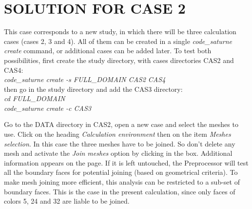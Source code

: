
%
%
%
%


\section{SOLUTION FOR CASE 2}
This case corresponds to a new study, in which there will be three calculation
cases (cases 2, 3 and 4). All of them can be created in a single {\itshape
code\_saturne create} command, or additional cases can be added later. To test both
possibilities, first create the study directory, with cases directories CAS2
and CAS4:\\
{\itshape code\_saturne create -s FULL\_DOMAIN CAS2 CAS4}\\
then go in the study directory and add the CAS3 directory:\\
{\itshape cd FULL\_DOMAIN}\\
{\itshape code\_saturne create -c CAS3}

Go to the DATA directory in CAS2,
open a new case and select the meshes to use. Click on the
heading {\itshape Calculation environment} then on the item {\itshape Meshes selection}. In this case the three meshes have to be
joined. So don't delete any mesh and activate the {\itshape Join meshes} option by clicking in the box. Additional information appears on the page. If it is
left untouched, the \CS Preprocessor will test all the boundary faces for
potential joining (based on geometrical criteria). To make mesh joining more
efficient, this analysis can be restricted to a sub-set of boundary faces. This
is the case in the present calculation, since only faces of colors 5, 24 and 32
are liable to be joined.

